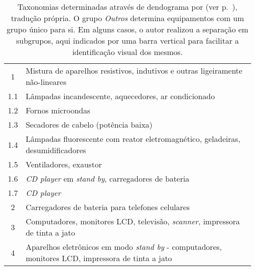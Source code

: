 \begin{table}[p]
{\begin{tabular}{p{1.3cm}p{17.7cm}}
\multicolumn{1}{c}{1} & Mistura de aparelhos resistivos, indutivos e
outras ligeiramente não-lineares \\
\multicolumn{1}{c|}{1.1} & Lâmpadas incandescente, aquecedores, ar
condicionado \\
\multicolumn{1}{c|}{1.2} & Fornos microondas \\
\multicolumn{1}{c|}{1.3} & Secadores de cabelo (potência baixa) \\
\multicolumn{1}{c|}{1.4} & Lâmpadas fluorescente com reator
eletromagnético, geladeiras, desumidificadores \\
\multicolumn{1}{c|}{1.5} & Ventiladores, exaustor \\
\multicolumn{1}{c|}{1.6} & \emph{CD player} em \emph{stand by},
carregadores de bateria \\
\multicolumn{1}{c|}{1.7} & \emph{CD player} \\
\multicolumn{1}{c}{2} & Carregadores de bateria para telefones
celulares \\
\multicolumn{1}{c}{3} & Computadores, monitores LCD, televisão,
\emph{scanner}, impressora de tinta a jato \\
\multicolumn{1}{c}{4} & Aparelhos eletrônicos em modo \emph{stand by}
- computadores, monitores LCD, impressora de tinta a jato \\
\hline \hline \hline
\end{tabular} } 
\caption[Taxonomias determinadas por LAM et al.: curvas I-V,
decomposiçao SVD e variáveis padrões 
]{Taxonomias determinadas através de dendograma por
\citet{nilm_lam_2007_33} (ver p.~\pageref{nilm:curvas_iv}), tradução
própria. O grupo \emph{Outros} determina equipamentos com um grupo
único para si. Em alguns casos, o autor realizou a separação em
subgrupos, aqui indicados por uma barra vertical para facilitar a
identificação visual dos mesmos.}
\label{tab:taxonomias_lam}
\end{table}
 
